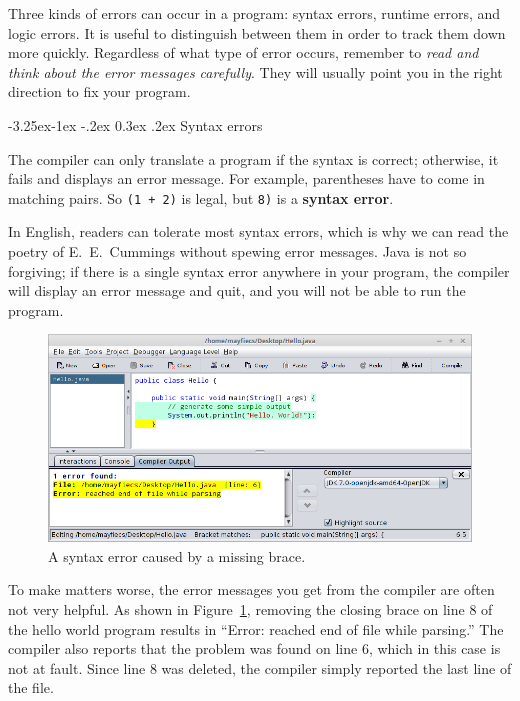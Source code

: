 \documentclass[12pt]{book}
\makeatletter
\theoremstyle{exercise}
\newcommand{\java}[1]{\verb"#1"}
\renewcommand\subsection{\@startsection{subsection}{2}{\z@}%
    {-3.25ex\@plus -1ex \@minus -.2ex}%
    {0.3ex \@plus .2ex}%
    {\normalfont\large\bfseries}}
\newcommand{\java}[1]{\lstinline{#1}} %
\makeatother
\begin{document}

Three kinds of errors can occur in a program: syntax errors, runtime errors, and logic errors.
It is useful to distinguish between them in order to track them down more quickly.
Regardless of what type of error occurs, remember to {\em read and think about the error messages carefully}.
They will usually point you in the right direction to fix your program.

\subsection{Syntax errors}


The compiler can only translate a program if the syntax is correct; otherwise, it fails and displays an error message.
For example, parentheses have to come in matching pairs.
So \java{(1 + 2)} is legal, but \java{8)} is a {\bf syntax error}.

In English, readers can tolerate most syntax errors, which is why we can read the poetry of E.\ E.\ Cummings without spewing error messages.
Java is not so forgiving; if there is a single syntax error anywhere in your program, the compiler will display an error message and quit, and you will not be able to run the program.

\begin{figure}[!h]
\begin{center}
\includegraphics[width=\textwidth]{figs/syntax-error.png}
\caption{A syntax error caused by a missing brace.}
\label{fig:syntax}
\end{center}
\end{figure}

To make matters worse, the error messages you get from the compiler are often not very helpful.
As shown in Figure~\ref{fig:syntax}, removing the closing brace on line 8 of the hello world program results in ``Error: reached end of file while parsing.''
The compiler also reports that the problem was found on line 6, which in this case is not at fault.
Since line 8 was deleted, the compiler simply reported the last line of the file.
\end{document}

